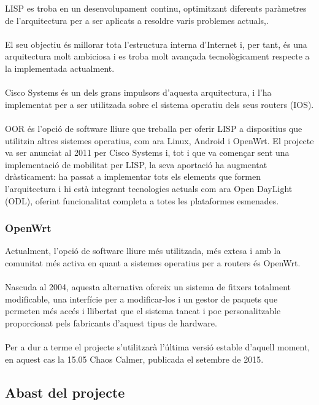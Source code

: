 \documentclass[11pt]{article}
\begin{document}
LISP es troba en un desenvolupament continu, optimitzant diferents paràmetres de l’arquitectura per a ser aplicats a resoldre varis problemes actuals\cite{freitas15},\cite{cisco15}.\\
\\
El seu objectiu és millorar tota l’estructura interna d’Internet i, per tant, és una arquitectura molt ambiciosa i es troba molt avançada tecnològicament respecte a la implementada actualment. \\
\\
Cisco Systems és un dels grans impulsors d’aquesta arquitectura, i l’ha implementat per a ser utilitzada sobre el sistema operatiu dels seus routers (IOS).\\
\\
OOR és l’opció de software lliure que treballa per oferir LISP a dispositius que utilitzin altres sistemes operatius, com ara Linux, Android i OpenWrt. El projecte va ser anunciat al 2011 per Cisco Systems i, tot i que va començar sent una implementació de mobilitat per LISP\cite{albert09}, la seva aportació ha augmentat dràsticament: ha passat a implementar tots els elements que formen l’arquitectura i hi està integrant tecnologies actuals com ara Open DayLight (ODL)\cite{alberts15}, oferint funcionalitat completa a totes les plataformes esmenades.

\subsubsection{OpenWrt}
Actualment, l’opció de software lliure més utilitzada, més extesa i amb la comunitat més activa en quant a sistemes operatius per a routers és OpenWrt. \\
\\
Nascuda al 2004, aquesta alternativa ofereix un sistema de fitxers totalment modificable, una interfície per a modificar-los i un gestor de paquets que permeten més accés i llibertat que el sistema tancat i poc personalitzable proporcionat pels fabricants d’aquest tipus de hardware.\\
\\
Per a dur a terme el projecte s’utilitzarà l’última versió estable d’aquell moment, en aquest cas la 15.05 Chaos Calmer, publicada el setembre de 2015.
\subsection{Abast del projecte}
\end{document}
